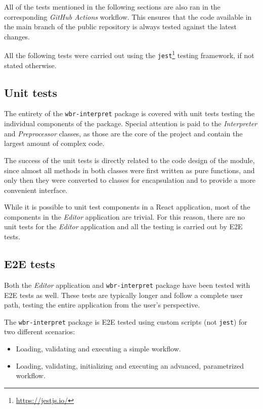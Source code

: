 All of the tests mentioned in the following sections are also ran in the corresponding \textit{GitHub Actions} workflow. 
This ensures that the code available in the main branch of the public repository is always tested against the latest changes.

All the following tests were carried out using the \texttt{jest}\footnote{\href{https://jestjs.io/}{https://jestjs.io/}} testing framework, if not stated otherwise.

\subsection{Unit tests}

The entirety of the \texttt{wbr-interpret} package is covered with unit tests testing the individual components of the package.
Special attention is paid to the \textit{Interpreter} and \textit{Preprocessor} classes, as those are the core of the project
and contain the largest amount of complex code. 

The success of the unit tests is directly related to the code design of the module, 
since almost all methods in both classes were first written as pure functions, and only then they were converted to classes for
encapsulation and to provide a more convenient interface.

\smallskip
While it is possible to unit test components in a React application, most of the components in the \textit{Editor} application are trivial.
For this reason, there are no unit tests for the \textit{Editor} application and all the testing is carried out by \ac{E2E} tests.

\subsection{E2E tests}

Both the \textit{Editor} application and \texttt{wbr-interpret} package have been tested with \acl{E2E} tests as well.
These tests are typically longer and follow a complete user path, testing the entire application from the user's perspective.

The \texttt{wbr-interpret} package is \acl{E2E} tested using custom scripts (not \texttt{jest}) for two different scenarios:
\begin{itemize}
    \item Loading, validating and executing a simple workflow.
    \item Loading, validating, initializing and executing an advanced, parametrized workflow.
\end{itemize}


